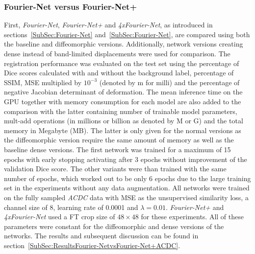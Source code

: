 \subsubsection{Fourier-Net versus Fourier-Net+} \label{SubSubSec:Fourier-NetvsFourier-Net+}
First, \emph{Fourier-Net}, \emph{Fourier-Net+} and \emph{4xFourier-Net}, as introduced in sections~\ref{SubSec:Fourier-Net} and~\ref{SubSec:Fourier-Net}, are compared using both the baseline and diffeomorphic versions. Additionally, network versions creating dense instead of band-limited displacements were used for comparison. The registration performance was evaluated on the test set using the percentage of Dice scores calculated with and without the background label, percentage of SSIM, MSE multiplied by $10^{-3}$ (denoted by m for milli) and the percentage of negative Jacobian determinant of deformation. The mean inference time on the GPU together with memory consumption for each model are also added to the comparison with the latter containing number of trainable model parameters, mult-add operations (in millions or billion as denoted by M or G) and the total memory in Megabyte (MB). The latter is only given for the normal versions as the diffeomorphic version require the same amount of memory as well as the baseline dense versions. The first network was trained for a maximum of 15 epochs with early stopping activating after 3 epochs without improvement of the validation Dice score. The other variants were than trained with the same number of epochs, which worked out to be only 6 epochs due to the large training set in the experiments without any data augmentation. All networks were trained on the fully sampled \emph{ACDC} data with MSE as the unsupervised similarity loss, a channel size of 8, learning rate of 0.0001 and $\lambda=0.01$. \emph{Fourier-Net+} and \emph{4xFourier-Net} used a FT crop size of $48 \times 48$ for these experiments. All of these parameters were constant for the diffeomorphic and dense versions of the networks. The results and subsequent discussion can be found in section~\ref{SubSec:ResultsFourier-NetvsFourier-Net+ACDC}.


